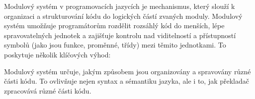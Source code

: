 
Modulový systém v programovacích jazycích je mechanismus, který slouží k organizaci a strukturování kódu do logických částí zvaných moduly. Modulový systém umožňuje programátorům rozdělit rozsáhlý kód do menších, lépe spravovatelných jednotek a zajišťuje kontrolu nad viditelností a přístupností symbolů (jako jsou funkce, proměnné, třídy) mezi těmito jednotkami. To poskytuje několik klíčových výhod:


Modulový systém určuje, jakým způsobem jsou organizovány a spravovány různé části kódu. To ovlivňuje nejen syntax a sémantiku jazyka, ale i to, jak překladač zpracovává různé části kódu.
